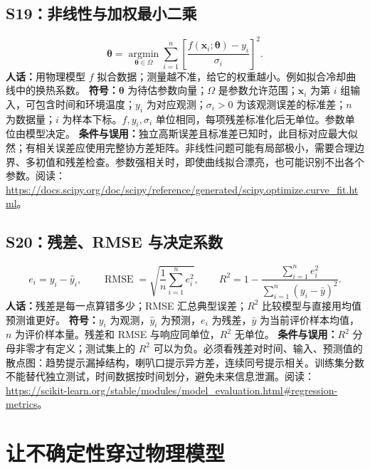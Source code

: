 \subsection{S19：非线性与加权最小二乘}
\begin{equation}
 \hat{\boldsymbol\theta}=\underset{\boldsymbol\theta\in\Omega}{\operatorname{argmin}}
 \sum_{i=1}^{n}\left[\frac{f(\mathbf x_i;\boldsymbol\theta)-y_i}{\sigma_i}\right]^2.
\end{equation}
\textbf{人话：}用物理模型 $f$ 拟合数据；测量越不准，给它的权重越小。例如拟合冷却曲线中的换热系数。
\textbf{符号：}$\boldsymbol\theta$ 为待估参数向量；$\Omega$ 是参数允许范围；$\mathbf x_i$ 为第 $i$ 组输入，可包含时间和环境温度；$y_i$ 为对应观测；$\sigma_i>0$ 为该观测误差的标准差；$n$ 为数据量；$i$ 为样本下标。$f,y_i,\sigma_i$ 单位相同，每项残差标准化后无单位。参数单位由模型决定。
\textbf{条件与误用：}独立高斯误差且标准差已知时，此目标对应最大似然；有相关误差应使用完整协方差矩阵。非线性问题可能有局部极小，需要合理边界、多初值和残差检查。参数强相关时，即使曲线拟合漂亮，也可能识别不出各个参数。阅读：\url{https://docs.scipy.org/doc/scipy/reference/generated/scipy.optimize.curve_fit.html}。

\subsection{S20：残差、RMSE 与决定系数}
\begin{equation}
 e_i=y_i-\hat y_i,\qquad
 \operatorname{RMSE}=\sqrt{\frac1n\sum_{i=1}^{n}e_i^2},\qquad
 R^2=1-\frac{\sum_{i=1}^{n}e_i^2}{\sum_{i=1}^{n}(y_i-\bar y)^2}.
\end{equation}
\textbf{人话：}残差是每一点算错多少；RMSE 汇总典型误差；$R^2$ 比较模型与直接用均值预测谁更好。
\textbf{符号：}$y_i$ 为观测，$\hat y_i$ 为预测，$e_i$ 为残差，$\bar y$ 为当前评价样本均值，$n$ 为评价样本量。残差和 RMSE 与响应同单位，$R^2$ 无单位。
\textbf{条件与误用：}$R^2$ 分母非零才有定义；测试集上的 $R^2$ 可以为负。必须看残差对时间、输入、预测值的散点图：趋势提示漏掉结构，喇叭口提示异方差，连续同号提示相关。训练集分数不能替代独立测试，时间数据按时间划分，避免未来信息泄漏。阅读：\url{https://scikit-learn.org/stable/modules/model_evaluation.html#regression-metrics}。

\section{让不确定性穿过物理模型}
